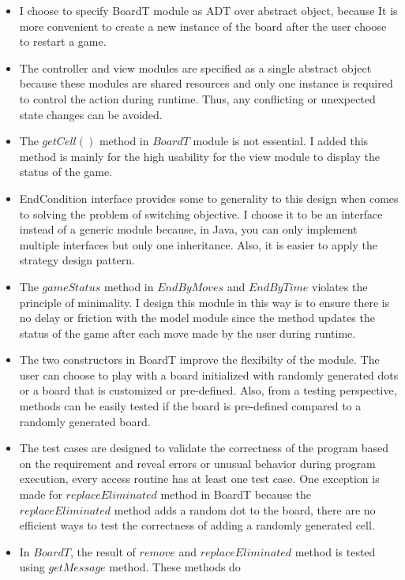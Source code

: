 \documentclass[12pt]{article}
\begin{document}
\begin{itemize}
  \item I choose to specify BoardT module as ADT over abstract object, because It is more convenient to create a new instance of the board after the 
        user choose to restart a game.
  \item The controller and view modules are specified as a single abstract object because these modules are shared resources and only one instance is required
        to control the action during runtime. Thus, any conflicting or unexpected state changes can be avoided.
  \item The $getCell()$ method in $BoardT$ module is not essential. I added this method 
        is mainly for the high usability for the view module to display the status of the game.
  \item EndCondition interface provides some to generality to this design when comes to solving the problem of switching objective.
        I choose it to be an interface instead of a generic module because, in Java, you can only implement multiple interfaces but only one inheritance. Also, it 
        is easier to apply the strategy design pattern.
  \item The $gameStatus$ method in $EndByMoves$ and $EndByTime$ violates the principle of minimality. I design this module in this way is to ensure
        there is no delay or friction with the model module since the method updates the status of the game after each move made by the user during runtime.
  \item The two constructors in BoardT improve the flexibilty of the module. The user can choose to play with a board 
        initialized with randomly generated dots or a board that is customized or pre-defined. Also, from a testing perspective, methods can be 
        easily tested if the board is pre-defined compared to a randomly generated board.
  \item The test cases are designed to validate the correctness of the program based on the requirement and reveal errors
        or unusual behavior during program execution, every access routine has at least one test case. One exception is
        made for $replaceEliminated$ method in BoardT because the $replaceEliminated$ method adds a random dot to the board, 
        there are no efficient ways to test the correctness of adding a randomly generated cell.
  \item In $BoardT$, the result of $remove$ and $replaceEliminated$ method is tested using $getMessage$ method. These methods do

\end{itemize}
\end{document}
